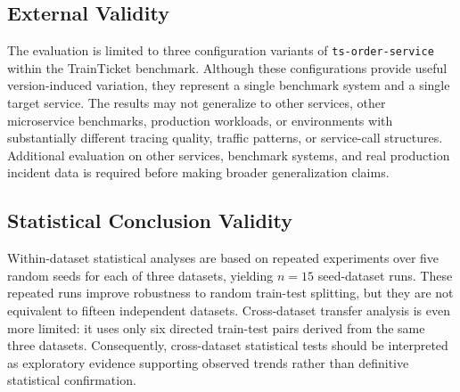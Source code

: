 \subsection{External Validity}

The evaluation is limited to three configuration variants of
\texttt{ts-order-service} within the TrainTicket benchmark. Although
these configurations provide useful version-induced variation, they
represent a single benchmark system and a single target service. The
results may not generalize to other services, other microservice
benchmarks, production workloads, or environments with substantially
different tracing quality, traffic patterns, or service-call structures.
Additional evaluation on other services, benchmark systems, and real
production incident data is required before making broader
generalization claims.

\subsection{Statistical Conclusion Validity}

Within-dataset statistical analyses are based on repeated experiments
over five random seeds for each of three datasets, yielding \(n=15\)
seed-dataset runs. These repeated runs improve robustness to random
train-test splitting, but they are not equivalent to fifteen independent
datasets. Cross-dataset transfer analysis is even more limited: it uses
only six directed train-test pairs derived from the same three datasets.
Consequently, cross-dataset statistical tests should be interpreted as
exploratory evidence supporting observed trends rather than definitive
statistical confirmation.